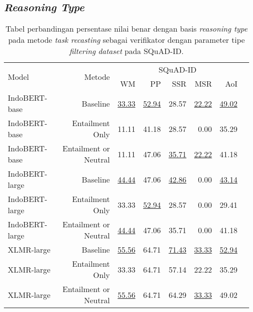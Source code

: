 \subsection*{\emph{Reasoning Type}}
\begin{table}[H]\centering
\begin{tabular}{lrrrrrrr}\toprule
\multirow{2}{*}{Model} &\multirow{2}{*}{Metode} &\multicolumn{5}{c}{SQuAD-ID} \\\cmidrule{3-7}
& &WM &PP &SSR &MSR &AoI \\\midrule
IndoBERT-base &Baseline &\underline{33.33} &\underline{52.94} &28.57 &\underline{22.22} &\underline{49.02} \\
IndoBERT-base &Entailment Only &11.11 &41.18 &28.57 &0.00 &35.29 \\
IndoBERT-base &Entailment or Neutral &11.11 &47.06 &\underline{35.71} &\underline{22.22} &41.18 \\
\hline
IndoBERT-large &Baseline &\underline{44.44} &47.06 &\underline{42.86} &0.00 &\underline{43.14} \\
IndoBERT-large &Entailment Only &33.33 &\underline{52.94} &28.57 &0.00 &29.41 \\
IndoBERT-large &Entailment or Neutral &\underline{44.44} &47.06 &35.71 &0.00 &41.18 \\
\hline
XLMR-large &Baseline &\underline{55.56} &64.71 &\underline{71.43} &\underline{33.33} &\underline{52.94} \\
XLMR-large &Entailment Only &33.33 &64.71 &57.14 &22.22 &35.29 \\
XLMR-large &Entailment or Neutral &\underline{55.56} &64.71 &64.29 &\underline{33.33} &49.02 \\
\bottomrule
\end{tabular}
\caption{Tabel perbandingan persentase nilai benar dengan basis \emph{reasoning type} pada metode \emph{task recasting} sebagai verifikator dengan parameter tipe \emph{filtering} \emph{dataset} pada SQuAD-ID.}
\end{table}

